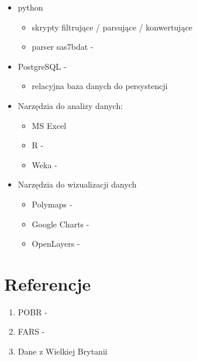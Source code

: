 \begin{itemize}
\item
  python \cite{python}

  \begin{itemize}
  \itemsep-14pt\parskip0pt
  \item
    skrypty filtrujące / parsujące / konwertujące\\
  \item
    parser sas7bdat - \cite{sas7bdat} \\
  \end{itemize}
\item
  PostgreSQL - \cite{postgres}

  \begin{itemize}
  \itemsep-14pt\parskip0pt
  \item
    relacyjna baza danych do persystencji\\
  \end{itemize}
\item
  Narzędzia do analizy danych:

  \begin{itemize}
  \itemsep-14pt\parskip0pt
  \item
    MS Excel\\
  \item
    R - \cite{r} \\
  \item
    Weka - \cite{weka} \\
  \end{itemize}
\item
  Narzędzia do wizualizacji danych

  \begin{itemize}
  \itemsep-14pt\parskip0pt
  \item
    Polymaps - \cite{polymaps} \\
  \item
    Google Charts - \cite{gcharts} \\
  \item
    OpenLayers - \cite{openlayers}
  \end{itemize}
\end{itemize}

\section{Referencje}\label{referencje}

\begin{enumerate}
\itemsep-14pt\parskip0pt
\item
  POBR - \cite{pobr}\\
\item
  FARS - \cite{fars}\\
\item
  Dane z Wielkiej Brytanii \cite{wb}
\end{enumerate}
